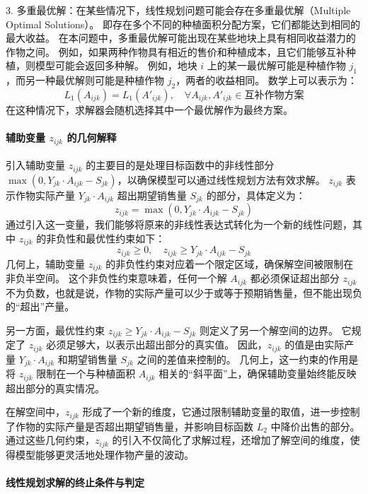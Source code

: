 \documentclass[12pt,a4paper]{nmmcm}
\begin{document}
3. 多重最优解：在某些情况下，线性规划问题可能会存在多重最优解（Multiple Optimal Solutions）。
即存在多个不同的种植面积分配方案，它们都能达到相同的最大收益。
在本问题中，多重最优解可能出现在某些地块上具有相同收益潜力的作物之间。
例如，如果两种作物具有相近的售价和种植成本，且它们能够互补种植，则模型可能会返回多种解。
例如，地块 $i$ 上的某一最优解可能是种植作物 $j_1$，而另一种最优解则可能是种植作物 $j_2$，两者的收益相同。
数学上可以表示为：
\[
  L_1(A_{ijk}) = L_1(A'_{ijk}), \quad \forall A_{ijk}, A'_{ijk} \in \text{互补作物方案}
\]
在这种情况下，求解器会随机选择其中一个最优解作为最终方案。





\paragraph{辅助变量 $z_{ijk}$ 的几何解释}

引入辅助变量 $z_{ijk}$ 的主要目的是处理目标函数中的非线性部分 $\max(0, Y_{jk} \cdot A_{ijk} - S_{jk})$，以确保模型可以通过线性规划方法有效求解。
$z_{ijk}$ 表示作物实际产量 $Y_{jk} \cdot A_{ijk}$ 超出期望销售量 $S_{jk}$ 的部分，具体定义为：
\[
  z_{ijk} = \max(0, Y_{jk} \cdot A_{ijk} - S_{jk})
\]
通过引入这一变量，我们能够将原来的非线性表达式转化为一个新的线性问题，其中 $z_{ijk}$ 的非负性和最优性约束如下：
\[
  z_{ijk} \geq 0, \quad z_{ijk} \geq Y_{jk} \cdot A_{ijk} - S_{jk}
\]
几何上，辅助变量 $z_{ijk}$ 的非负性约束对应着一个限定区域，确保解空间被限制在非负半空间。
这个非负性约束意味着，任何一个解 $A_{ijk}$ 都必须保证超出部分 $z_{ijk}$ 不为负数，也就是说，作物的实际产量可以少于或等于预期销售量，但不能出现负的“超出”产量。


另一方面，最优性约束 $z_{ijk} \geq Y_{jk} \cdot A_{ijk} - S_{jk}$ 则定义了另一个解空间的边界。
它规定了 $z_{ijk}$ 必须足够大，以表示出超出部分的真实值。
因此，$z_{ijk}$ 的值是由实际产量 $Y_{jk} \cdot A_{ijk}$ 和期望销售量 $S_{jk}$ 之间的差值来控制的。
几何上，这一约束的作用是将 $z_{ijk}$ 限制在一个与种植面积 $A_{ijk}$ 相关的“斜平面”上，确保辅助变量始终能反映超出部分的真实情况。


在解空间中，$z_{ijk}$ 形成了一个新的维度，它通过限制辅助变量的取值，进一步控制了作物的实际产量是否超出期望销售量，并影响目标函数 $L_2$ 中降价出售的部分。
通过这些几何约束，$z_{ijk}$ 的引入不仅简化了求解过程，还增加了解空间的维度，使得模型能够更灵活地处理作物产量的波动。


\paragraph{线性规划求解的终止条件与判定}
\end{document}
